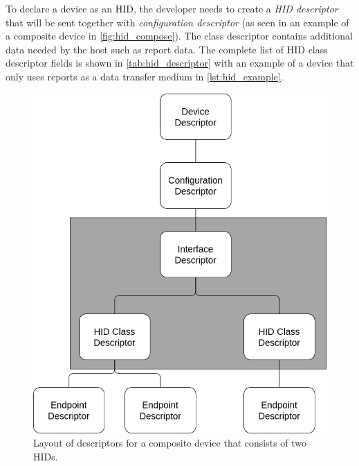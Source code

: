 To declare a device as an HID, the developer needs to create a \emph{HID descriptor} that will be sent together with \emph{configuration descriptor} (as seen in an example of a composite device in \autoref{fig:hid_compose}). The class descriptor contains additional data needed by the host such as report data. The complete list of HID class descriptor fields is shown in \autoref{tab:hid_descriptor} with an example of a device that only uses reports as a data transfer medium in \autoref{lst:hid_example}.

\begin{figure}[ht]
    \centering
    \includegraphics[width=0.5\linewidth]{obrazky-figures/hid_descriptor.png}
    \caption{Layout of descriptors for a composite device that consists of two HIDs.}
    \label{fig:hid_compose}
\end{figure}

